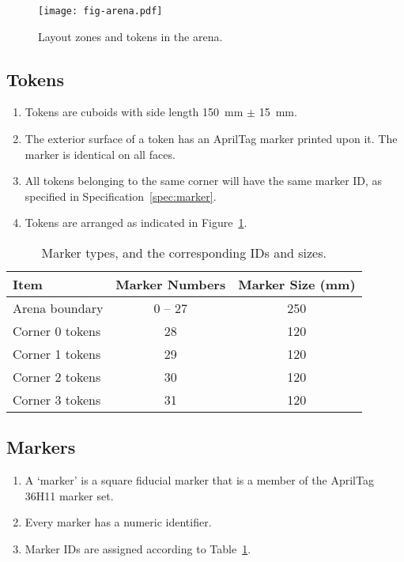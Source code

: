 \begin{figure}
  \texttt{[image: fig-arena.pdf]}
  \caption{Layout zones and tokens in the arena.}
  \label{fig:arena}
\end{figure}

\subsection{Tokens}
\label{spec:tokens}

\begin{enumerate}
  \item Tokens are cuboids with side length \SI{150}{mm} $\pm$ \SI{15}{mm}.
  \item The exterior surface of a token has an AprilTag marker printed upon it. The marker is identical on all faces.
  \item All tokens belonging to the same corner will have the same marker ID, as specified in Specification~\ref{spec:marker}.
  \item Tokens are arranged as indicated in Figure~\ref{fig:arena}.
\end{enumerate}

\begin{table}[t]
      \centering
      \begin{tabular}{lcc}
            \toprule
            \textbf{Item} & \textbf{Marker Numbers} & \textbf{Marker Size (mm)} \\
            \midrule
            Arena boundary & {} 0 -- 27 & 250 \\
            Corner 0 tokens & 28 & 120 \\
            Corner 1 tokens & 29 & 120 \\
            Corner 2 tokens & 30 & 120 \\
            Corner 3 tokens & 31 & 120 \\
            \bottomrule
      \end{tabular}
      \caption{Marker types, and the corresponding IDs and sizes.}
      \label{tab:markers}
\end{table}

\subsection{Markers}
\label{spec:marker}

\begin{enumerate}
  \item A `marker' is a square fiducial marker that is a member of the AprilTag 36H11 marker set.
  \item Every marker has a numeric identifier.
  \item Marker IDs are assigned according to Table~\ref{tab:markers}.
\end{enumerate}
